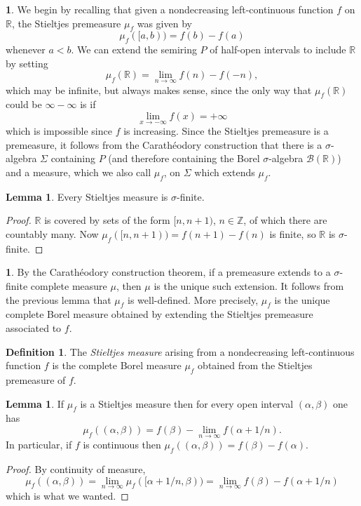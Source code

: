\documentclass[12pt]{book}
\newcommand{\ZZ}{\mathbb{Z}}
\newcommand{\RR}{\mathbb{R}}
\newcommand{\dfn}[1]{\emph{#1}\index{#1}}
\theoremstyle{definition}
\newtheorem{lemma}[theorem]{Lemma}
\newtheorem{subsec}[theorem]{}
\newtheorem{definition}[theorem]{Definition}
\begin{document}
\begin{subsec}
We begin by recalling that given a nondecreasing left-continuous function $f$ on $\RR$, the Stieltjes premeasure $\mu_f$ was given by
$$\mu_f([a, b)) = f(b) - f(a)$$
whenever $a < b$.
We can extend the semiring $P$ of half-open intervals to include $\RR$ by setting
$$\mu_f(\RR) = \lim_{n \to \infty} f(n) - f(-n),$$
which may be infinite, but always makes sense, since the only way that $\mu_f(\RR)$ could be $\infty - \infty$ is if
$$\lim_{x \to -\infty} f(x) = +\infty$$
which is impossible since $f$ is increasing.
Since the Stieltjes premeasure is a premeasure, it follows from the Carathéodory construction that there is a $\sigma$-algebra $\Sigma$ containing $P$ (and therefore containing the Borel $\sigma$-algebra $\mathcal B(\RR)$) and a measure, which we also call $\mu_f$, on $\Sigma$ which extends $\mu_f$.
\end{subsec}

\begin{lemma}
Every Stieltjes measure is $\sigma$-finite.
\end{lemma}
\begin{proof}
$\RR$ is covered by sets of the form $[n, n + 1)$, $n \in \ZZ$, of which there are countably many.
Now $\mu_f([n, n + 1)) = f(n+1) - f(n)$ is finite, so $\RR$ is $\sigma$-finite.
\end{proof}

\begin{subsec}
By the Carathéodory construction theorem, if a premeasure extends to a $\sigma$-finite complete measure $\mu$, then $\mu$ is the unique such extension.
It follows from the previous lemma that $\mu_f$ is well-defined.
More precisely, $\mu_f$ is the unique complete Borel measure obtained by extending the Stieltjes premeasure associated to $f$.
\end{subsec}

\begin{definition}
The \dfn{Stieltjes measure} arising from a nondecreasing left-continuous function $f$ is the complete Borel measure $\mu_f$ obtained from the Stieltjes premeasure of $f$.
\end{definition}

\begin{lemma}
If $\mu_f$ is a Stieltjes measure then for every open interval $(\alpha, \beta)$ one has
$$\mu_f((\alpha, \beta)) = f(\beta) - \lim_{n \to \infty} f(\alpha + 1/n).$$
In particular, if $f$ is continuous then $\mu_f((\alpha, \beta)) = f(\beta) - f(\alpha)$.
\end{lemma}
\begin{proof}
By continuity of measure,
$$\mu_f((\alpha, \beta)) = \lim_{n \to \infty} \mu_f([\alpha + 1/n, \beta)) = \lim_{n \to \infty} f(\beta) - f(\alpha + 1/n)$$
which is what we wanted.
\end{proof}
\end{document}
